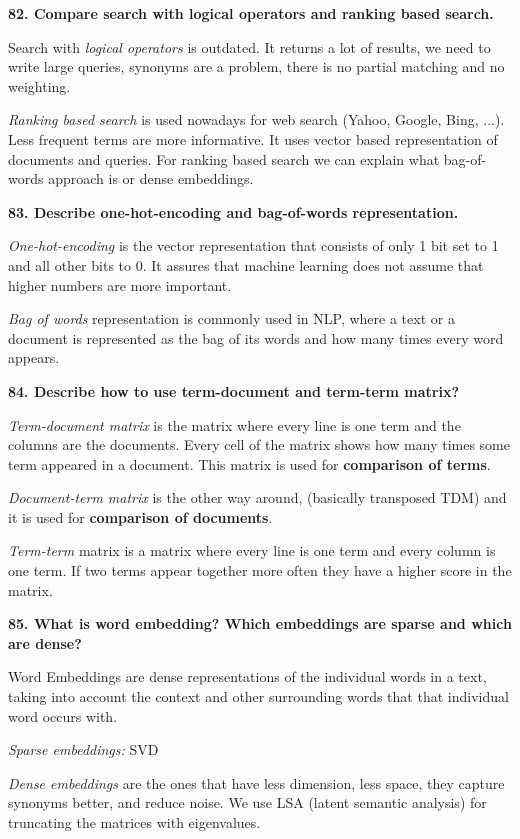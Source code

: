 \textbf{82. Compare search with logical operators and ranking based
search.}

Search with \textit{logical operators} is outdated. It returns a lot
of results, we need to write large queries, synonyms are a problem,
there is no partial matching and no weighting.

\textit{Ranking based search} is used nowadays for web search (Yahoo,
Google, Bing, ...). Less frequent terms are more informative. It uses
vector based representation of documents and queries. For ranking based
search we can explain what bag-of-words approach is or dense embeddings.

\textbf{83. Describe one-hot-encoding and bag-of-words representation.}

\textit{One-hot-encoding} is the vector representation that consists
of only 1 bit set to 1 and all other bits to 0. It assures that machine
learning does not assume that higher numbers are more important.

\textit{Bag of words} representation is commonly used in NLP, where a
text or a document is represented as the bag of its words and how many
times every word appears.

\textbf{84. Describe how to use term-document and term-term matrix?}

\textit{Term-document matrix} is the matrix where every line is one
term and the columns are the documents. Every cell of the matrix shows
how many times some term appeared in a document. This matrix is used for
\textbf{comparison of terms}.

\textit{Document-term matrix} is the other way around, (basically
transposed TDM) and it is used for \textbf{comparison of documents}.

\textit{Term-term} matrix is a matrix where every line is one term
and every column is one term. If two terms appear together more often
they have a higher score in the matrix.

\textbf{85. What is word embedding? Which embeddings are sparse and
which are dense?}

Word Embeddings are dense representations of the individual words in a
text, taking into account the context and other surrounding words that
that individual word occurs with.

\textit{Sparse embeddings:} SVD

\textit{Dense embeddings} are the ones that have less dimension, less
space, they capture synonyms better, and reduce noise. We use LSA
(latent semantic analysis) for truncating the matrices with eigenvalues.

